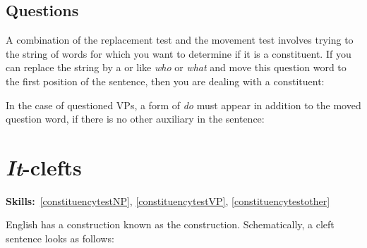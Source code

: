 \documentclass{article}
\begin{document}
    \subsection{Questions}
A combination of the replacement test and the movement test involves trying to  the string of words for which you want to determine if it is a constituent.
If you can replace the string by a  or  like \emph{who} or \emph{what} and move this question word to the first position of the sentence, then you are dealing with a constituent:
\begin{exe}
\end{exe}

In the case of questioned VPs, a form of \emph{do} must appear in addition to the moved question word, if there is no other auxiliary in the sentence:
\begin{exe}
\end{exe}

\section{\emph{It}-clefts}
\hfill{}\textbf{Skills:}~\ref{constituencytestNP},
\ref{constituencytestVP},
\ref{constituencytestother}

English has a construction known as the  construction.
Schematically, a cleft sentence looks as follows:
\begin{exe}
\label{it_cleft_schema}
\end{exe}
\end{document}
